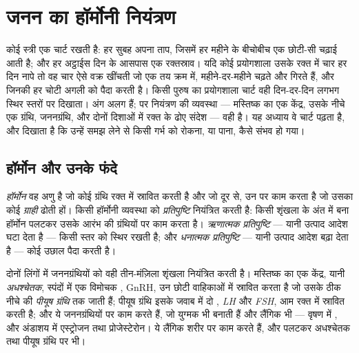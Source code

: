 \chapter{जनन का हॉर्मोनी नियंत्रण}\label{ch:g11:hormones-and-reproduction}

कोई स्त्री एक चार्ट रखती है: हर सुबह अपना ताप, जिसमें हर महीने के बीचोबीच
एक छोटी-सी चढ़ाई आती है; और हर अट्ठाईस दिन के आसपास एक रक्तस्राव। यदि कोई
प्रयोगशाला उसके रक्त में चार  हर दिन नापे तो वह चार ऐसे वक्र खींचती
जो एक तय क्रम में, महीने-दर-महीने चढ़ते और गिरते हैं, और जिनकी हर चोटी
अगली को पैदा करती है। किसी पुरुष का प्रयोगशाला चार्ट वही  दिन-दर-दिन
लगभग स्थिर स्तरों पर दिखाता। अंग अलग हैं; पर नियंत्रण की व्यवस्था ---
मस्तिष्क का एक केंद्र, उसके नीचे एक ग्रंथि, जननग्रंथि, और दोनों दिशाओं में
रक्त के ढोए संदेश --- वही है। यह अध्याय वे चार्ट पढ़ता है, और दिखाता है कि
उन्हें समझ लेने से किसी गर्भ को रोकना, या पाना, कैसे संभव हो गया।

\section{हॉर्मोन और उनके फंदे}

\begin{definition}[हॉर्मोन, प्रतिपुष्टि]\label{def:g11:hormones-and-reproduction:hormone}
\emph{हॉर्मोन} वह अणु है जो कोई ग्रंथि रक्त में स्रावित
करती है और जो दूर से, उन  पर काम करता है जो उसका कोई
\emph{ग्राही} ढोती हों। किसी हॉर्मोनी व्यवस्था को
\emph{प्रतिपुष्टि} नियंत्रित करती है: किसी शृंखला के
अंत में बना हॉर्मोन पलटकर उसके आरंभ की ग्रंथियों पर काम करता है।
\emph{ऋणात्मक प्रतिपुष्टि} --- यानी उत्पाद आदेश घटा देता है --- किसी स्तर
को स्थिर रखती है; और \emph{धनात्मक प्रतिपुष्टि} --- यानी उत्पाद आदेश बढ़ा
देता है --- कोई उछाल पैदा करती है।
\end{definition}

\begin{proposition}[साझा शृंखला]\label{prop:g11:hormones-and-reproduction:chain}
दोनों लिंगों में जननग्रंथियों को वही तीन-मंज़िला शृंखला नियंत्रित करती है।
मस्तिष्क का एक केंद्र, यानी \emph{अधश्चेतक}, स्पंदों में एक विमोचक
, GnRH, उन छोटी वाहिकाओं में स्रावित करता है जो उसके ठीक नीचे की
\emph{पीयूष ग्रंथि} तक जाती हैं; पीयूष ग्रंथि इसके जवाब में दो ,
\emph{LH} और \emph{FSH}, आम रक्त में स्रावित करती है; और ये जननग्रंथियों
पर काम करते हैं, जो युग्मक भी बनाती हैं और लैंगिक  भी --- वृषण में
, और अंडाशय में एस्ट्रोजन तथा प्रोजेस्टेरोन। ये लैंगिक
 शरीर पर काम करते हैं, और पलटकर अधश्चेतक तथा पीयूष ग्रंथि पर भी।
\end{proposition}
\admitted

